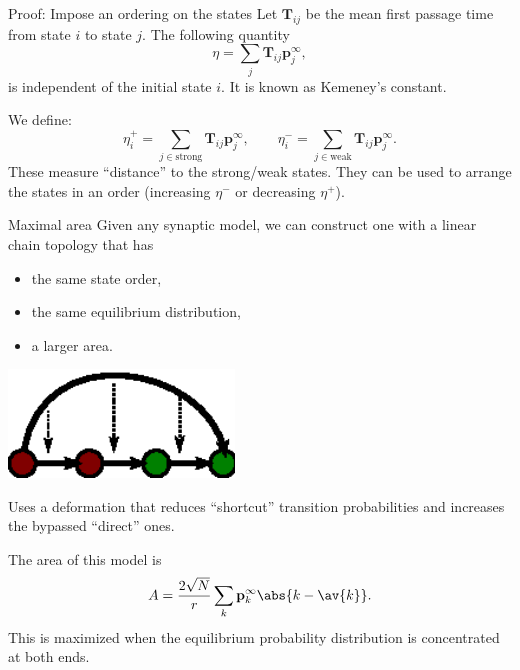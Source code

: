 \documentclass[final,hyperref={pdfpagelabels=false,bookmarks=false}]{beamer}
\newcommand{\citerr}[1]{\hfill {\footnotesize{\color{darkgrey}\cite{#1}}}}
\newcommand{\eq}{\mathbf{p}^\infty}
\newcommand{\fpt}{\mathbf{T}}
\begin{document}
\begin{frame}{}
\begin{columns}[t]
\begin{column}{0.37\linewidth}

\begin{block}{Proof: Impose an ordering on the states}
%
 Let $\fpt_{ij}$ be the mean first passage time from state $i$ to state $j$.
 The following quantity
 \begin{equation*}
   \eta = \sum_j \fpt_{ij} \eq_j,
 \end{equation*}
 is independent of the initial state $i$.
 It is known as Kemeney's constant. \citerr{kemeny1960finite}

 \vp We define:
 \begin{equation*}
   \eta^+_i = \sum_{j\in\text{strong}} \fpt_{ij} \eq_j,
   \qquad
   \eta^-_i = \sum_{j\in\text{weak}} \fpt_{ij} \eq_j.
 \end{equation*}
 These measure ``distance'' to the strong/weak states.
 They can be used to arrange the states in an order (increasing $\eta^-$ or decreasing $\eta^+$).
%
\end{block}


\begin{block}{Maximal area}
%
 Given any synaptic model, we can construct one with a linear chain topology that has
 \parbox[c]{15cm}{
  \begin{itemize}
    \item the same state order,
    \item the same equilibrium distribution,
    \item a larger area.
  \end{itemize}
 }
 \parbox[c]{15cm}{
  \begin{center}
    \includegraphics[width=6cm]{shortcut.eps}
  \end{center}
 }

 Uses a deformation that reduces ``shortcut'' transition probabilities and increases the bypassed ``direct'' ones.

 \vp The area of this model is
 \begin{equation*}
   A = \frac{2\sqrt{N}}{r}\sum_k \eq_k \abs{k-\av{k}}.
 \end{equation*}
 This is maximized when the equilibrium probability distribution is concentrated at both ends.
%
\end{block}






\end{column}
\end{columns}
\end{frame}
\end{document}
